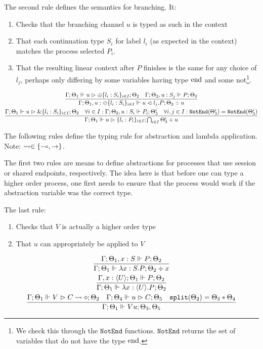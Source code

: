 The second rule defines the semantics for branching. It:
\begin{enumerate}
    \item Checks that the branching channel $u$ is typed as such in the context
    \item That each continuation type $S_i$ for label $l_i$ (as expected in the context) matches the process selected $P_i$.
    \item That the resulting linear context after $P$ finishes is the same for any choice of $l_j$, perhaps only differing by some variables having type $\text{end}$ and some not\footnote{We check this through the $\texttt{NotEnd}$ functions.  $\texttt{NotEnd}$ returns the set of variables that do not have the type $\text{end}$.}. 
\end{enumerate}
\begin{gather*}
\frac{\Gamma ; \Theta_1 \Vdash u \vartriangleright \oplus \{l_i : S_i\}_{i\in I}; \Theta_2 \quad \Gamma ; \Theta_2 , u : S_j \Vdash P ; \Theta_3}{\Gamma ; \Theta_1 , u : \oplus\{l_i : S_i\}_{i \in I} \Vdash u \vartriangleleft l_j . P ; \Theta_3 \div u} \\
\frac{\Gamma ; \Theta_1 \Vdash u \vartriangleright \& \{l_i : S_i\}_{i \in I}; \Theta_2 \quad \forall i \in I :\Gamma ; \Theta_2 , u : S_i \Vdash P_i ; \Theta^i_3 \quad \forall i,j \in I : \texttt{NotEnd}(\Theta^i_3) = \texttt{NotEnd}(\Theta_3^i)}{\Gamma ; \Theta_1 \Vdash u \vartriangleright \{l_i : P_i\}_{i \in I} ; \bigcap_{i \in I} \Theta_3^i \div u} \\
\end{gather*}

The following rules define the typing rule for abstraction and lambda application. Note: $\leadsto \in \{\multimap, \rightarrow\}$.

The first two rules are means to define abstractions for processes that use session or shared endpoints, respectively. The idea here is that before one can type a higher order process, one first needs to ensure that the process would work if the abstraction variable was the correct type.

The last rule:
\begin{enumerate}
    \item Checks that $V$ is actually a higher order type
    \item That $u$ can appropriately be applied to $V$
\end{enumerate}
\begin{gather*}
\frac{\Gamma ; \Theta_1 , x : S \Vdash P ; \Theta_2}{\Gamma ; \Theta_1 \Vdash \lambda x : S . P ; \Theta_2 \div x} \\
\frac{\Gamma, x : \langle U \rangle ; \Theta_1 \Vdash P ; \Theta_2}{\Gamma ; \Theta_1 \Vdash \lambda x : \langle U \rangle . P ; \Theta_2} \\
\frac{\Gamma ; \Theta_1 \Vdash V \vartriangleright C \leadsto \diamond ; \Theta_2 \quad \Gamma ; \Theta_4 \Vdash u \vartriangleright C ; \Theta_5 \quad \texttt{split}(\Theta_2) = \Theta_3 * \Theta_4}{\Gamma ; \Theta_1 \Vdash V u ; \Theta_3 , \Theta_5}
\end{gather*}

